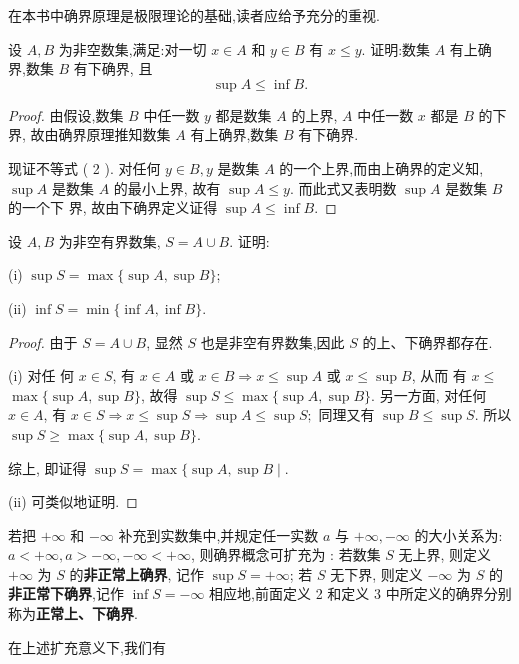 在本书中确界原理是极限理论的基础,读者应给予充分的重视.

\begin{example}
	设 $A, B$ 为非空数集,满足:对一切 $x \in A$ 和 $y \in B$ 有 $x \leqslant y .$ 证明:数集 $A$ 有上确 界,数集 $B$ 有下确界, 且
	\[
	\sup A \leqslant \inf B. \tag{2}
	\]
\end{example}

\begin{proof}
	由假设,数集 $B$ 中任一数 $y$ 都是数集 $A$ 的上界, $A$ 中任一数 $x$ 都是 $B$ 的下界, 故由确界原理推知数集 $A$ 有上确界,数集 $B$ 有下确界.

	现证不等式 ( 2 ). 对任何 $y \in B, y$ 是数集 $A$ 的一个上界,而由上确界的定义知, $\sup A$ 是数集 $A$ 的最小上界, 故有 $\sup A \leqslant y$. 而此式又表明数 $\sup A$ 是数集 $B$ 的一个下
界, 故由下确界定义证得 $\sup A \leqslant \inf B$.
\end{proof}


\begin{example}
	设 $A, B$ 为非空有界数集, $S=A \cup B$. 证明:

	(i) $\sup S=\max \{\sup A, \sup B\}$;

	(ii) $\inf S=\min \{\inf A, \inf B\}$.
\end{example}

\begin{proof}
	由于 $S=A \cup B$, 显然 $S$ 也是非空有界数集,因此 $S$ 的上、下确界都存在.

	(i) 对任 何 $x \in S$, 有 $x \in A$ 或 $x \in B \Rightarrow x \leqslant \sup A$ 或 $x \leqslant \sup B$, 从而 有 $x \leqslant$ $\max \{\sup A, \sup B\}$, 故得 $\sup S \leqslant \max \{\sup A, \sup B\} .$ 另一方面, 对任何 $x \in A$, 有 $x \in S \Rightarrow x \leqslant \sup S \Rightarrow \sup A \leqslant \sup S ;$ 同理又有 $\sup B \leqslant \sup S.$ 所以 $\sup S \geqslant \max \{\sup A, \sup B\}$.

	综上, 即证得 $\sup S=\max \{\sup A, \sup B \mid$.

	(ii) 可类似地证明.
\end{proof}


若把 $+\infty$ 和 $-\infty$ 补充到实数集中,并规定任一实数 $a$ 与 $+\infty,-\infty$ 的大小关系为: $a<+\infty, a>-\infty,-\infty<+\infty$, 则确界概念可扩充为 : 若数集 $S$ 无上界, 则定义 $+\infty$ 为 $S$ 的\textbf{非正常上确界}, 记作 $\sup S=+\infty$; 若 $S$ 无下界, 则定义 $-\infty$ 为 $S$ 的\textbf{非正常下确界},记作 $\inf S=-\infty$ 相应地,前面定义 2 和定义 3 中所定义的确界分别称为\textbf{正常上、下确界}.

在上述扩充意义下,我们有

